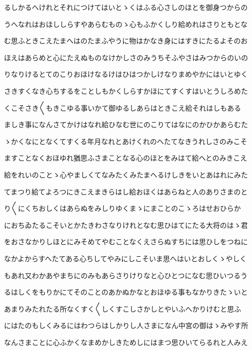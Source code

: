 \documentclass[a4paper,11pt,landscape]{ltjtarticle}
\begin{document}
\par\medskip
るしかるへけれとそれにつけてはいとゝくはふる心さしのほとを御身つからの
\par\medskip
うへなれはおほししらすやあらむものゝ心もふかくしり給めれはさりともとな
\par\medskip
む思ふときこえたまへはのたまふやうに物はかなき身にはすきにたるよそのお
\par\medskip
ほえはあらめと心にたえぬものなけかしさのみうちそふやさはみつからのいの
\par\medskip
りなりけるとてのこりおほけなるけはひはつかしけなりまめやかにはいとゆく
\par\medskip
さきすくなき心ちするをことしもかくしらすかほにてすくすはいとうしろめた
\par\medskip
くこそさき〱もきこゆる事いかて御ゆるしあらはときこえ給それはしもある
\par\medskip
ましき事になんさてかけはなれ給ひなむ世にのこりてはなにのかひかあらむた
\par\medskip
ゝかくなにとなくてすくる年月なれとあけくれのへたてなきうれしさのみこそ
\par\medskip
ますことなくおほゆれ猶思ふさまことなる心のほとをみはて給へとのみきこえ
\par\medskip
給をれいのことゝ心やましくてなみたくみたまへるけしきをいとあはれにみた
\par\medskip
てまつり給てよろつにきこえまきらはし給おほくはあらねと人のありさまのと
\par\medskip
り〱にくちおしくはあらぬをみしりゆくまゝにまことのこゝろはせおひらか
\par\medskip
におちゐたるこそいとかたきわさなりけれとなむ思ひはてにたる大将のはゝ君
\par\medskip
をおさなかりしほとにみそめてやむことなくえさらぬすちには思ひしをつねに
\par\medskip
なかよからすへたてある心ちしてやみにしこそいま思へはいとおしくゝやしく
\par\medskip
もあれ又わかあやまちにのみもあらさりけりなと心ひとつになむ思ひいつるう
\par\medskip
るはしくをもりかにてそのことのあかぬかなとおほゆる事もなかりきたゝいと
\par\medskip
あまりみたれたる所なくすく〱しくすこしさかしとやいふへかりけむと思ふ
\par\medskip
にはたのもしくみるにはわつらはしかりし人さまになん中宮の御はゝみやす所
\par\medskip
なんさまことに心ふかくなまめかしきためしにはまつ思ひいてらるれと人みえ
\par\medskip
\end{document}
